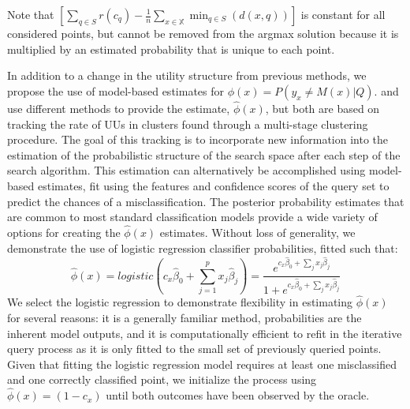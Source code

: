 \documentclass[conference]{IEEEtran}
\begin{document}
Note that $\left[\sum_{q \in S} r \left(c_q\right) - \frac{1}{n} \sum_{x \in \mathbb{X}} \min_{q \in S}\left(d\left(x,q\right)\right)\right]$ is constant for all considered points, but cannot be removed from the argmax solution because it is multiplied by an estimated probability that is unique to each point. 

In addition to a change in the utility structure from previous methods, we propose the use of model-based estimates for $\phi(x) = P\left(y_x \neq M(x) |Q \right)$. \citet{Lakkaraju2016} and \citet{Bansal2018} use different methods to provide the  estimate, $\hat{\phi}(x)$, but both are based on tracking the rate of UUs in clusters found through a multi-stage clustering procedure. The goal of this tracking is to incorporate new information into the estimation of the probabilistic structure of the search space after each step of the search algorithm. This estimation can alternatively be accomplished using model-based estimates, fit using the features and confidence scores of the query set to predict the chances of a misclassification. The posterior probability estimates that are common to most standard classification models provide a wide variety of options for creating the $\hat{\phi}(x)$ estimates. Without loss of generality, we demonstrate the use of logistic regression classifier probabilities, fitted such that:
$$\hat{\phi}(x) = logistic(c_x\hat{\beta}_0 + \sum_{j=1}^p x_j\hat{\beta}_j) = \frac{e^{c_x\hat{\beta}_0 + \sum_j x_j\hat{\beta}_j}}{1+e^{c_x\hat{\beta}_0 + \sum_j x_j\hat{\beta}_j}}$$
We select the logistic regression to demonstrate flexibility in estimating $\hat{\phi}(x)$ for several reasons: it is a generally familiar method, probabilities are the inherent model outputs, and it is computationally efficient to refit in the iterative query process as it is only fitted to the small set of previously queried points. Given that fitting the logistic regression model requires at least one misclassified and one correctly classified point, we initialize the process using $\hat{\phi}(x) =(1-c_x)$ until both outcomes have been observed by the oracle.
\end{document}
